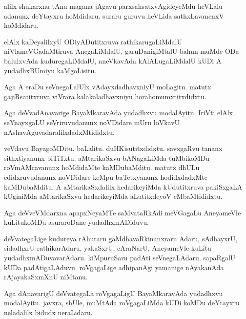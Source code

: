 \documentclass{article}
\begin{document}
\begin{mn}%
alilx shukarxnu tAnu magana jAgavu parxsahsatxvAgideyeMdu heVLalu adanunx deYtayxru 
hoMdidaru. suraru guruvu heVLida sathxLavanenxV hoMdidaru.
\end{mn}

\begin{mn}%
elAlx kaDeyalilxyU ODiyADutitxruva rathikarugaLiMdalU niVlameVGadaMtiruva AnegaLiMdalU, 
garuDanigiMtalU bahun muMde ODa balulxvAda kuduregaLiMdalU, aneVkavAda kAlALugaLiMdalU kUDi 
A yudadhxBUmiyu kaMgoLisitu.
\end{mn}

\begin{mn}%
Aga A eraDu seVnegaLalUlx vAdayxdadhavxniyU moLagitu. matutx gajiRsatitxruva viVrara 
kalakaladhavxniyu horahomumxtitxdidxtu.
\end{mn}

\begin{mn}%
Aga deVvadAnavarige BayaMkaravAda yudadhxvu modalAyitu. IriVti elAlx seYnayxgaLU 
seVriruvudanunx noVDidare mUru loVkavU nAshavAguvadaralilxdadxMtididxtu.
\end{mn}

\begin{mn}%
veVdavu BayagoMDitu. baLalitu. duHKisutitxdidxtu. savxgaRvu tananx sithxtiyanunx biTiTxtu. 
aMtarikaSxvu bANagaLiMda tuMbikoMDu roVmAMcavanunx hoMdidaMte kaMDubaMditu. matutx dhULu 
edidxruvudanunx noVDidare keMpu baTetxyanunx hodidxdadxMte kaMDubaMditu. A aMtarikaSxdalilx
hedarikeyiMda kUdutitxruva pakiSxgaLA kUginiMda aMtarikaSxvu hedarikeyiMda aLutitxdeyoV 
eMbaMtididxtu.
\end{mn}

\begin{mn}%
Aga deVveVMdarxna apapxNeyaMTe saMvataRkAdi meVGagaLu AneyameVle kuLitukoMDu  asuraroDane 
yudadhxmADiduvu.
\end{mn}

\begin{mn}%
deVvategaLige kudureya rAhutaru gaMdhavaRkinanxraru Adaru, sAdhayxrU, sidadhxrU 
rathikarAdaru, yakaSxrU, cAraNarU, AneyameVle kuLitu yudadhxmADuvavarAdaru. kiMpuruSaru 
padAti seVnegaLAdaru. sapaRgalU kUDa padAtigaLAduvu. roVgagaLige adhipanAgi yamanige 
nAyakanAda rAjayakaSxmXnU niMtanu.
\end{mn}

\begin{mn}%
Aga dAnavarigU deVvategaLa roVgagaLigU BayaMkaravAda yudadhxvu modalAyitu. javxra, shUle, 
muMtAda roVgagaLiMda kUDi koMDu deYtayxru neladalilx bidudx neraLidaru.
\end{mn}
\end{document}
